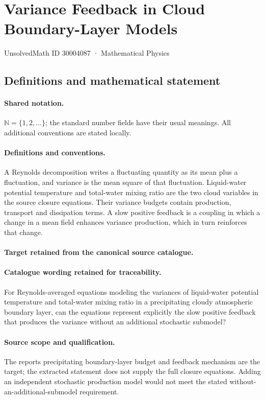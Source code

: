 \documentclass[11pt]{article}
\begin{document}
\setcounter{section}{30004086}
\section{Variance Feedback in Cloud Boundary-Layer Models}\label{30004087}
{\small UnsolvedMath ID 30004087 · Mathematical Physics}
\subsection{Definitions and mathematical statement}

\paragraph{Shared notation.}$\mathbb N=\{1,2,\ldots\}$; the standard number fields have their usual meanings. All additional conventions are stated locally.


\paragraph{Definitions and conventions.}
A Reynolds decomposition writes a fluctuating quantity as its mean plus a fluctuation, and variance is the mean square of that fluctuation. Liquid-water potential temperature and total-water mixing ratio are the two cloud variables in the source closure equations. Their variance budgets contain production, transport and dissipation terms. A slow positive feedback is a coupling in which a change in a mean field enhances variance production, which in turn reinforces that change.

\paragraph{Target retained from the canonical source catalogue.}
\paragraph{Catalogue wording retained for traceability.}
For Reynolds-averaged equations modeling the variances of liquid-water potential temperature and total-water mixing ratio in a precipitating cloudy atmospheric boundary layer, can the equations represent explicitly the slow positive feedback that produces the variance without an additional stochastic submodel?

\paragraph{Source scope and qualification.}
The report\textquotesingle s precipitating boundary-layer budget and feedback mechanism are the target; the extracted statement does not supply the full closure equations. Adding an independent stochastic production model would not meet the stated without-an-additional-submodel requirement.
\end{document}
